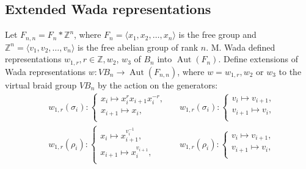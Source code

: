 \documentclass[11 pt, reqno]{amsart}
\theoremstyle{definition}
\numberwithin{equation}{subsection}
\newcommand{\Aut}{\operatorname{Aut}}
\begin{document}


\subsection{Extended Wada representations}\label{SS: Generalized Wada representation}
Let $F_{n,n} = F_n \ast \mathbb{Z}^n$, where $F_n=\langle x_1, x_2, \ldots,x_n \rangle$ is the free group and
$\mathbb{Z}^n = \langle v_1, v_2, \ldots, v_n \rangle$ is the free abelian group of rank $n$.
M. Wada \cite{Wada-1} defined representations $w_{1,r},  r \in \mathbb{Z}, w_2$,  $ w_3$ of $B_n$ into $\Aut(F_{n})$. 
Define extensions of Wada representations
$w: VB_n \rightarrow \Aut(F_{n,n})$, where $w=w_{1,r}, w_2$ or $ w_3$ to the virtual braid group $VB _n$ by the action on the generators:
\begin{align*}
&w_{1,r}(\sigma_i) :
\left\{
\begin{array}{l}
  x_i \mapsto  x_i^r x_{i+1} x_i^{-r}, \\
  x_{i+1} \mapsto x_i,  \\
\end{array}
\right.~~~
&w_{1,r}(\sigma_i) :
\left\{
\begin{array}{l}
  v_i \mapsto  v_{i+1}, \\
  v_{i+1} \mapsto v_i,  \\
\end{array}
\right.\\
&w_{1,r}(\rho_i) :
\left\{
\begin{array}{l}
  x_i \mapsto  x_{i+1}^{v_i^{-1}}, \\
  x_{i+1} \mapsto x_i^{v_{i+1}},  \\
\end{array}
\right.~~~
&w_{1,r}(\rho_i) :
\left\{
\begin{array}{l}
  v_i \mapsto  v_{i+1}, \\
  v_{i+1} \mapsto v_i , \\
\end{array}
\right.
\end{align*}
\end{document}

